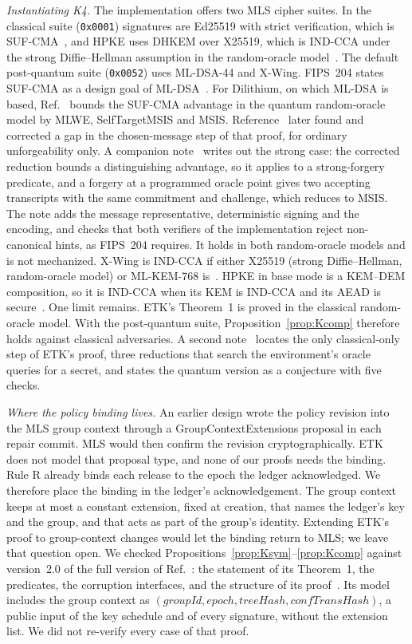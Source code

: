 \documentclass[aps,prx,reprint,superscriptaddress,nofootinbib,floatfix]{revtex4-2}
\theoremstyle{remark}
\begin{document}
\emph{Instantiating K4.} The implementation offers two MLS cipher suites. In the classical suite (\texttt{0x0001}) signatures are Ed25519 with strict verification, which is SUF-CMA~\cite{ed25519-provable}, and HPKE uses DHKEM over X25519, which is IND-CCA under the strong Diffie--Hellman assumption in the random-oracle model~\cite{dhies}. The default post-quantum suite (\texttt{0x0052}) uses ML-DSA-44 and X-Wing. FIPS~204 states SUF-CMA as a design goal of ML-DSA~\cite{fips204}. For Dilithium, on which ML-DSA is based, Ref.~\cite{kls18} bounds the SUF-CMA advantage in the quantum random-oracle model by MLWE, SelfTargetMSIS and MSIS. Reference~\cite{fsa-fix} later found and corrected a gap in the chosen-message step of that proof, for ordinary unforgeability only. A companion note~\cite{note-suf} writes out the strong case: the corrected reduction bounds a distinguishing advantage, so it applies to a strong-forgery predicate, and a forgery at a programmed oracle point gives two accepting transcripts with the same commitment and challenge, which reduces to MSIS. The note adds the message representative, deterministic signing and the encoding, and checks that both verifiers of the implementation reject non-canonical hints, as FIPS~204 requires. It holds in both random-oracle models and is not mechanized. X-Wing is IND-CCA if either X25519 (strong Diffie--Hellman, random-oracle model) or ML-KEM-768 is~\cite{xwing}. HPKE in base mode is a KEM--DEM composition, so it is IND-CCA when its KEM is IND-CCA and its AEAD is secure~\cite{cramer-shoup}. One limit remains. ETK's Theorem~1 is proved in the classical random-oracle model. With the post-quantum suite, Proposition~\ref{prop:Kcomp} therefore holds against classical adversaries. A second note~\cite{note-qrom} locates the only classical-only step of ETK's proof, three reductions that search the environment's oracle queries for a secret, and states the quantum version as a conjecture with five checks.

\emph{Where the policy binding lives.} An earlier design wrote the policy revision into the MLS group context through a GroupContextExtensions proposal in each repair commit. MLS would then confirm the revision cryptographically. ETK does not model that proposal type, and none of our proofs needs the binding. Rule R already binds each release to the epoch the ledger acknowledged. We therefore place the binding in the ledger's acknowledgement. The group context keeps at most a constant extension, fixed at creation, that names the ledger's key and the group, and that acts as part of the group's identity. Extending ETK's proof to group-context changes would let the binding return to MLS; we leave that question open. We checked Propositions~\ref{prop:Ksym}--\ref{prop:Kcomp} against version~2.0 of the full version of Ref.~\cite{etk}: the statement of its Theorem~1, the predicates, the corruption interfaces, and the structure of its proof~\cite{note-etk}. Its model includes the group context as $(\mathit{groupId},\mathit{epoch},\mathit{treeHash},\mathit{confTransHash})$, a public input of the key schedule and of every signature, without the extension list. We did not re-verify every case of that proof.
\end{document}
